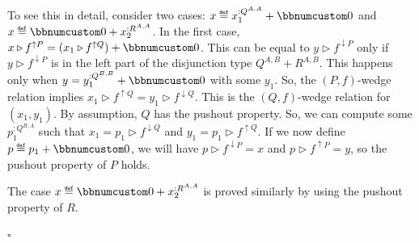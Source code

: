 To see this in detail, consider two cases: $x\triangleq x_{1}^{:Q^{A,A}}+\bbnum 0$
and $x\triangleq\bbnum 0+x_{2}^{:R^{A,A}}$. In the first case, $x\triangleright f^{\uparrow P}=(x_{1}\triangleright f^{\uparrow Q})+\bbnum 0$.
This can be equal to $y\triangleright f^{\downarrow P}$ only if $y\triangleright f^{\downarrow P}$
is in the left part of the disjunction type $Q^{A,B}+R^{A,B}$. This
happens only when $y=y_{1}^{:Q^{B,B}}+\bbnum 0$ with some $y_{1}$.
So, the $\left(P,f\right)$-wedge relation implies $x_{1}\triangleright f^{\uparrow Q}=y_{1}\triangleright f^{\downarrow Q}$.
This is the $\left(Q,f\right)$-wedge relation for $(x_{1},y_{1})$.
By assumption, $Q$ has the pushout property. So, we can compute some
$p_{1}^{:Q^{B,A}}$ such that $x_{1}=p_{1}\triangleright f^{\downarrow Q}$
and $y_{1}=p_{1}\triangleright f^{\uparrow Q}$. If we now define
$p\triangleq p_{1}+\bbnum 0$, we will have $p\triangleright f^{\downarrow P}=x$
and $p\triangleright f^{\uparrow P}=y$, so the pushout property of
$P$ holds.

The case $x\triangleq\bbnum 0+x_{2}^{:R^{A,A}}$ is proved similarly
by using the pushout property of $R$. %

$\square$

